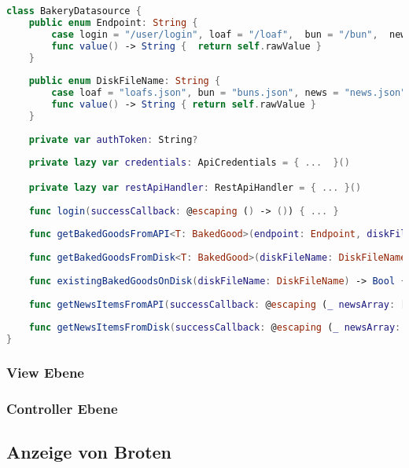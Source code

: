 \begin{lstlisting}[language=Swift]
class BakeryDatasource {
    public enum Endpoint: String {
        case login = "/user/login", loaf = "/loaf",  bun = "/bun",  news = "/news", picture = "/picture"
        func value() -> String {  return self.rawValue }
    }
    
    public enum DiskFileName: String {
        case loaf = "loafs.json", bun = "buns.json", news = "news.json"
        func value() -> String { return self.rawValue }
    }
    
    private var authToken: String?
    
    private lazy var credentials: ApiCredentials = { ...  }()

    private lazy var restApiHandler: RestApiHandler = { ... }()
    
    func login(successCallback: @escaping () -> ()) { ... }
    
    func getBakedGoodsFromAPI<T: BakedGood>(endpoint: Endpoint, diskFileName: DiskFileName, successCallback: @escaping (_ loafArray: [T], _ imageDataArray: [Data])->()) { ... }
    
    func getBakedGoodsFromDisk<T: BakedGood>(diskFileName: DiskFileName, successCallback: @escaping (_ loafArray: [T], _ imageDataArray: [Data])->()) { ... }
    
    func existingBakedGoodsOnDisk(diskFileName: DiskFileName) -> Bool { ... }
    
    func getNewsItemsFromAPI(successCallback: @escaping (_ newsArray: [NewsItem], _ imageDataArray: [Data])->()) { ... }
    
    func getNewsItemsFromDisk(successCallback: @escaping (_ newsArray: [NewsItem], _ imageDataArray: [Data])->()) { ... }
}

\end{lstlisting}

\clearpage

\subsubsection{View Ebene}

\clearpage

\subsubsection{Controller Ebene}

\clearpage

\subsection{Anzeige von Broten}

